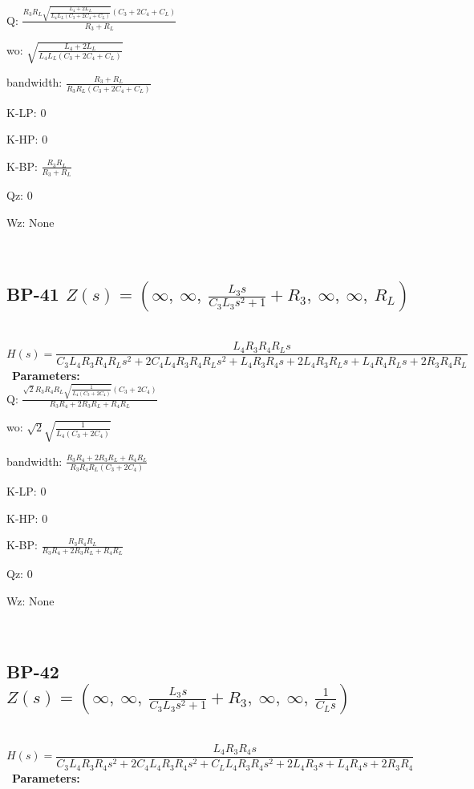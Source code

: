\documentclass{article}
\begin{document}
Q: $\frac{R_{3} R_{L} \sqrt{\frac{L_{4} + 2 L_{L}}{L_{4} L_{L} \left(C_{3} + 2 C_{4} + C_{L}\right)}} \left(C_{3} + 2 C_{4} + C_{L}\right)}{R_{3} + R_{L}}$\ 

wo: $\sqrt{\frac{L_{4} + 2 L_{L}}{L_{4} L_{L} \left(C_{3} + 2 C_{4} + C_{L}\right)}}$\ 

bandwidth: $\frac{R_{3} + R_{L}}{R_{3} R_{L} \left(C_{3} + 2 C_{4} + C_{L}\right)}$\ 

K-LP: $0$\ 

K-HP: $0$\ 

K-BP: $\frac{R_{3} R_{L}}{R_{3} + R_{L}}$\ 

Qz: $0$\ 

Wz: $\text{None}$\ 

\ 

\subsection{BP-41 $Z(s) = \left( \infty, \  \infty, \  \frac{L_{3} s}{C_{3} L_{3} s^{2} + 1} + R_{3}, \  \infty, \  \infty, \  R_{L}\right)$ } \ 
\textbf{\[H(s) = \frac{L_{4} R_{3} R_{4} R_{L} s}{C_{3} L_{4} R_{3} R_{4} R_{L} s^{2} + 2 C_{4} L_{4} R_{3} R_{4} R_{L} s^{2} + L_{4} R_{3} R_{4} s + 2 L_{4} R_{3} R_{L} s + L_{4} R_{4} R_{L} s + 2 R_{3} R_{4} R_{L}}\] } \ 
\textbf{Parameters:}\\ 

Q: $\frac{\sqrt{2} R_{3} R_{4} R_{L} \sqrt{\frac{1}{L_{4} \left(C_{3} + 2 C_{4}\right)}} \left(C_{3} + 2 C_{4}\right)}{R_{3} R_{4} + 2 R_{3} R_{L} + R_{4} R_{L}}$\ 

wo: $\sqrt{2} \sqrt{\frac{1}{L_{4} \left(C_{3} + 2 C_{4}\right)}}$\ 

bandwidth: $\frac{R_{3} R_{4} + 2 R_{3} R_{L} + R_{4} R_{L}}{R_{3} R_{4} R_{L} \left(C_{3} + 2 C_{4}\right)}$\ 

K-LP: $0$\ 

K-HP: $0$\ 

K-BP: $\frac{R_{3} R_{4} R_{L}}{R_{3} R_{4} + 2 R_{3} R_{L} + R_{4} R_{L}}$\ 

Qz: $0$\ 

Wz: $\text{None}$\ 

\ 

\subsection{BP-42 $Z(s) = \left( \infty, \  \infty, \  \frac{L_{3} s}{C_{3} L_{3} s^{2} + 1} + R_{3}, \  \infty, \  \infty, \  \frac{1}{C_{L} s}\right)$ } \ 
\textbf{\[H(s) = \frac{L_{4} R_{3} R_{4} s}{C_{3} L_{4} R_{3} R_{4} s^{2} + 2 C_{4} L_{4} R_{3} R_{4} s^{2} + C_{L} L_{4} R_{3} R_{4} s^{2} + 2 L_{4} R_{3} s + L_{4} R_{4} s + 2 R_{3} R_{4}}\] } \ 
\textbf{Parameters:}\\ 
\end{document}
